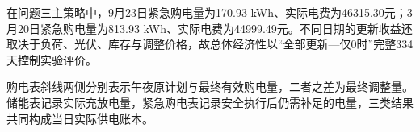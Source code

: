 在问题三主策略中，9月23日紧急购电量为170.93 kWh、实际电费为46315.30元；3月20日紧急购电量为813.93 kWh、实际电费为44999.49元。不同日期的更新收益还取决于负荷、光伏、库存与调整价格，故总体经济性以“全部更新—仅0时”完整334天控制实验评价。

购电表斜线两侧分别表示午夜原计划与最终有效购电量，二者之差为最终调整量。储能表记录实际充放电量，紧急购电表记录安全执行后仍需补足的电量，三类结果共同构成当日实际供电账本。

